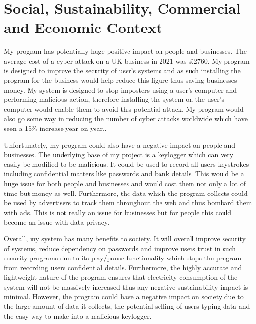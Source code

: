 \documentclass[10pt,a4paper]{report}
\begin{document}
\section{Social, Sustainability, Commercial and Economic Context}

My program has potentially huge positive impact on people and businesses. The average cost of a cyber attack on a UK business in 2021 was £2760\cite{o'dea_2022}. My program is designed to improve the security of user's systems and as such installing the program for the business would help reduce this figure thus saving businesses money. My system is designed to stop imposters using a user's computer and performing malicious action, therefore installing the system on the user's computer would enable them to avoid this potential attack. My program would also go some way in reducing the number of cyber attacks worldwide which have seen a 15\% increase year on year.\cite{karafiloski_2021}. 

Unfortunately, my program could also have a negative impact on people and businesses. The underlying base of my project is a keylogger which can very easily be modified to be malicious. It could be used to record all users keystrokes including confidential matters like passwords and bank details. This would be a huge issue for both people and businesses and would cost them not only a lot of time but money as well. Furthermore, the data which the program collects could be used by advertisers to track them throughout the web and thus bombard them with ads. This is not really an issue for businesses but for people this could become an issue with data privacy. 

Overall, my system has many benefits to society. It will overall improve security of systems, reduce dependency on passwords and improve users trust in such security programs due to its play/pause functionality which stops the program from recording users confidential details. Furthermore, the highly accurate and lightweight nature of the program ensures that electricity consumption of the system will not be massively increased thus any negative sustainability impact is minimal. However, the program could have a negative impact on society due to the large amount of data it collects, the potential selling of users typing data and the easy way to make into a malicious keylogger. 
\end{document}
